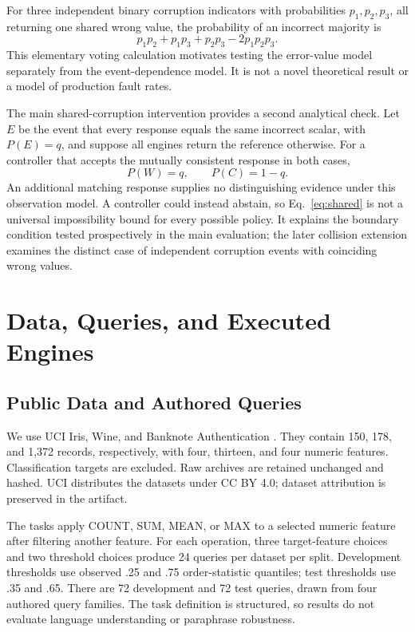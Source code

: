 \documentclass{svproc}
\begin{document}
For three independent binary corruption indicators with probabilities $p_1,p_2,p_3$, all returning one shared wrong value, the probability of an incorrect majority is
\begin{equation}
p_1p_2+p_1p_3+p_2p_3-2p_1p_2p_3.
\end{equation}
This elementary voting calculation motivates testing the error-value model separately from the event-dependence model. It is not a novel theoretical result or a model of production fault rates.

The main shared-corruption intervention provides a second analytical check. Let $E$ be the event that every response equals the same incorrect scalar, with $P(E)=q$, and suppose all engines return the reference otherwise. For a controller that accepts the mutually consistent response in both cases,
\begin{equation}
P(W)=q,\qquad P(C)=1-q.
\label{eq:shared}
\end{equation}
An additional matching response supplies no distinguishing evidence under this observation model. A controller could instead abstain, so Eq.~\ref{eq:shared} is not a universal impossibility bound for every possible policy. It explains the boundary condition tested prospectively in the main evaluation; the later collision extension examines the distinct case of independent corruption events with coinciding wrong values.

\section{Data, Queries, and Executed Engines}
\subsection{Public Data and Authored Queries}
We use UCI Iris, Wine, and Banknote Authentication \cite{iris,wine,banknote}. They contain 150, 178, and 1,372 records, respectively, with four, thirteen, and four numeric features. Classification targets are excluded. Raw archives are retained unchanged and hashed. UCI distributes the datasets under CC BY 4.0; dataset attribution is preserved in the artifact.

The tasks apply COUNT, SUM, MEAN, or MAX to a selected numeric feature after filtering another feature. For each operation, three target-feature choices and two threshold choices produce 24 queries per dataset per split. Development thresholds use observed .25 and .75 order-statistic quantiles; test thresholds use .35 and .65. There are 72 development and 72 test queries, drawn from four authored query families. The task definition is structured, so results do not evaluate language understanding or paraphrase robustness.
\end{document}
